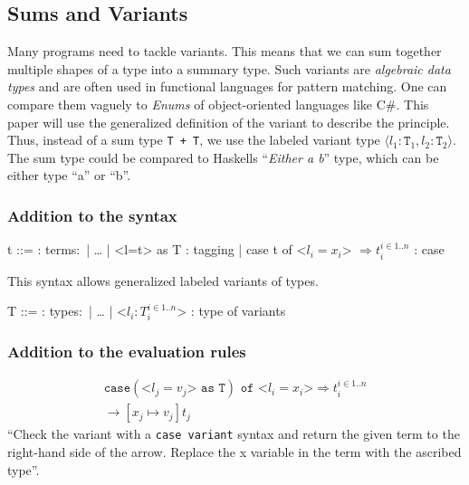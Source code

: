 \subsection{Sums and Variants}
\label{subsec:variants}

Many programs need to tackle variants. This means
that we can sum together multiple shapes of a type into a summary
type. Such variants are \textit{algebraic data types} and are often used in functional
languages for pattern matching. One can compare them vaguely to \textit{Enums} of
object-oriented languages like C\#.
This paper will use the generalized definition
of the variant to describe the principle. Thus, instead of a sum type \texttt{T + T},
we use the labeled variant type $\langle l_1 \colon \texttt{T}_1, l_2 \colon \texttt{T}_2 \rangle$.
The sum type could be compared to Haskells ``\textit{Either a b}'' type, which can be
either type ``a'' or ``b''.

\subsubsection{Addition to the syntax \cite{pierce2002ProgLang}}
\begin{bnfgrammar}
    t ::= : terms$\colon$
    | \dots
    | <l=t> as T : tagging
    | case t of <$l_i=x_i$> $\Rightarrow t_i^{i \in 1..n}$ : case
\end{bnfgrammar}\leavevmode\newline
This syntax allows generalized labeled variants of types.

\begin{bnfgrammar}
    T ::= : types$\colon$
    | \dots
    | <$l_i \colon T_i^{i \in 1..n}$> : type of variants
\end{bnfgrammar}\leavevmode\newline

\subsubsection{Addition to the evaluation rules \cite{pierce2002ProgLang}}
\begin{equation*}
    \tag{Case variant}
    \begin{split}
        \texttt{case} (\text{<}l_j=v_j\text{>} \texttt{ as } \texttt{T}) \texttt{ of } \text{<}l_i=x_i\text{>} \Rightarrow t_i^{i \in 1..n} \\
        \rightarrow [x_j \mapsto v_j]t_j
    \end{split}
\end{equation*}
``Check the variant with a \texttt{case variant} syntax and return
the given term to the right-hand side of the arrow. Replace the
x variable in the term with the ascribed type''.

